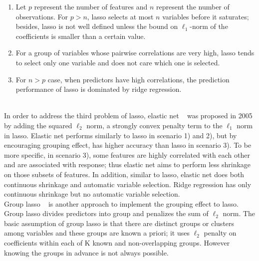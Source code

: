 \documentclass[11pt]{article}
\begin{document}
\begin{enumerate} 

\item

Let $p$ represent the number of features and $n$ represent the number of observations. For $p>n$, lasso selects at most $n$ variables before it saturates; besides, lasso is not well defined unless the bound on $\ell_1$-norm of the coefficients is smaller than a certain value.
\item

For a group of variables whose pairwise correlations are very high, lasso tends to select only one variable and does not care which one is selected.

\item

 For $n>p$ case, when predictors have high correlations, the prediction performance of lasso is dominated by ridge regression.\\ \\

\end{enumerate}

In order to address the third problem of lasso, elastic net ~\cite{Zou2005Reg} was proposed in 2005 by adding the squared $\ell_2$ norm, a strongly convex penalty term to the $\ell_1$ norm in lasso. Elastic net performs similarly to lasso in scenario 1) and 2), but by encouraging grouping effect, has higher accuracy than lasso in scenario 3). To be more specific, in scenario 3), some features are highly correlated with each other and are associated with response; thus elastic net aims to perform less shrinkage on those subsets of features. In addition, similar to lasso, elastic net does both continuous shrinkage and automatic variable selection. Ridge regression has only continuous shrinkage but no automatic variable selection.\\

Group lasso ~\cite{Francis2008Con} is another approach to implement the grouping effect to lasso. Group lasso divides predictors into group and penalizes the sum of $\ell_2$ norm. The basic assumption of group lasso is that there are distinct groups or clusters among variables and these groups are known a priori; it uses $\ell_2$ penalty on coefficients within each of K known and non-overlapping groups. However knowing the groups in advance is not always possible.\\
\end{document}
